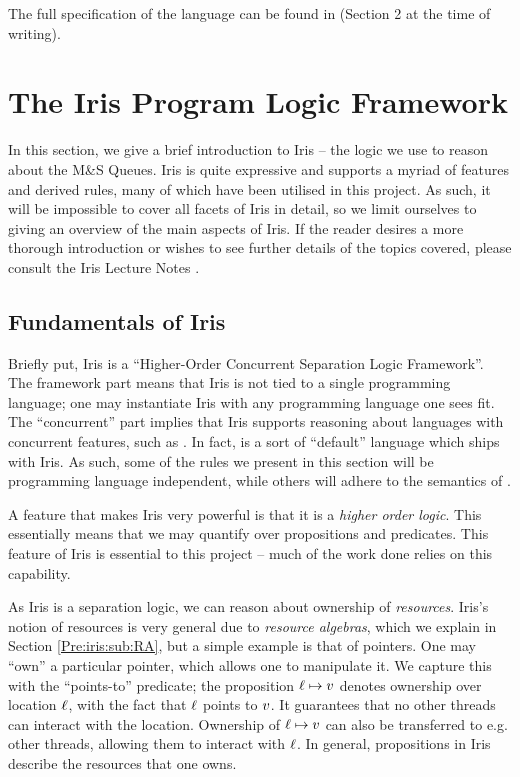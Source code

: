 \documentclass[a4paper, 10pt]{report}
\theoremstyle{definition}
\newcommand{\msq}{M\&S Queue}
\begin{document}
The full specification of the language can be found in \citet{gentleiris} (Section 2 at the time of writing).

\section{The Iris Program Logic Framework}
\label{Pre:section:iris}

In this section, we give a brief introduction to Iris -- the logic we use to reason about the \msq{}s. Iris is quite expressive and supports a myriad of features and derived rules, many of which have been utilised in this project. As such, it will be impossible to cover all facets of Iris in detail, so we limit ourselves to giving an overview of the main aspects of Iris. If the reader desires a more thorough introduction or wishes to see further details of the topics covered, please consult the Iris Lecture Notes \citep{gentleiris}.

\subsection{Fundamentals of Iris}
\label{Pre:iris:sub:fund}

Briefly put, Iris is a \enquote{Higher-Order Concurrent Separation Logic Framework}. The framework part means that Iris is not tied to a single programming language; one may instantiate Iris with any programming language one sees fit. The ``concurrent'' part implies that Iris supports reasoning about languages with concurrent features, such as \heaplang. In fact, \heaplang is a sort of ``default'' language which ships with Iris. As such, some of the rules we present in this section will be programming language independent, while others will adhere to the semantics of \heaplang.

A feature that makes Iris very powerful is that it is a \textit{higher order logic}. This essentially means that we may quantify over propositions and predicates. This feature of Iris is essential to this project -- much of the work done relies on this capability.

As Iris is a separation logic, we can reason about ownership of \textit{resources}. Iris's notion of resources is very general due to \textit{resource algebras}, which we explain in Section \ref{Pre:iris:sub:RA}, but a simple example is that of pointers. One may ``own'' a particular pointer, which allows one to manipulate it. We capture this with the ``points-to'' predicate; the proposition $\ell \mapsto v$ denotes ownership over location $\ell$, with the fact that $\ell$ points to $v$. It guarantees that no other threads can interact with the location. Ownership of $\ell \mapsto v$ can also be transferred to e.g. other threads, allowing them to interact with $\ell$. In general, propositions in Iris describe the resources that one owns.
\end{document}
